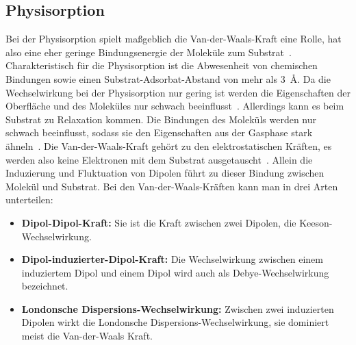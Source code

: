         \subsection{Physisorption}
            Bei der Physisorption spielt maßgeblich die Van-der-Waals-Kraft eine Rolle, hat also eine eher geringe Bindungsenergie der Moleküle zum Substrat~\cite{cinchetti_activating_2017}.
            Charakteristisch für die Physisorption ist die Abwesenheit von chemischen Bindungen sowie einen Substrat-Adsorbat-Abstand von mehr als \SI{3}{\angstrom}. %
            Da die Wechselwirkung bei der Physisorption nur gering ist werden die Eigenschaften der Oberfläche und des Moleküles nur schwach beeinflusst~\cite{bergenti_spinterface_2019}.
            Allerdings kann es beim Substrat zu Relaxation kommen.
            Die Bindungen des Moleküls werden nur schwach beeinflusst, sodass sie den Eigenschaften aus der Gasphase stark ähneln~\cite{cinchetti_activating_2017}.
            Die Van-der-Waals-Kraft gehört zu den elektrostatischen Kräften, es werden also keine Elektronen mit dem Substrat ausgetauscht~\cite{bergenti_spinterface_2019}.
            Allein die Induzierung und Fluktuation von Dipolen führt zu dieser Bindung zwischen Molekül und Substrat.
            Bei den Van-der-Waals-Kräften kann man in drei Arten unterteilen:
            \begin{itemize}
                \item \textbf{Dipol-Dipol-Kraft:} Sie ist die Kraft zwischen zwei Dipolen, die Keeson-Wechselwirkung.
                \item \textbf{Dipol-induzierter-Dipol-Kraft:} Die Wechselwirkung zwischen einem induziertem Dipol und einem Dipol wird auch als Debye-Wechselwirkung bezeichnet.
                \item \textbf{Londonsche Dispersions-Wechselwirkung:} Zwischen zwei induzierten Dipolen wirkt die Londonsche Dispersions-Wechselwirkung, sie dominiert meist die Van-der-Waals Kraft.
            \end{itemize}
        
